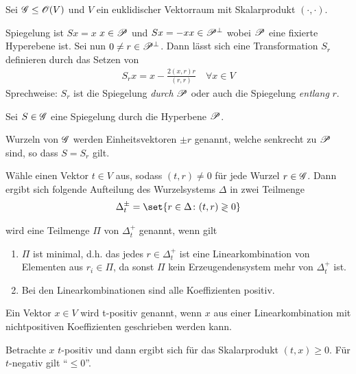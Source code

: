 Sei $\G \le \O(V)$ und $V$ ein euklidischer Vektorraum mit Skalarprodukt $(\cdot, \cdot)$.
\begin{*definition}
	Spiegelung ist $Sx = x$ $x \in \P$ und $Sx = -x x \in \P^{\perp}$ wobei $\P$ eine fixierte Hyperebene ist. Sei nun $0 \neq r \in \P^{\perp}$. Dann lässt sich eine Transformation $S_r$ definieren durch das Setzen von
	\begin{align*}
		S_r x = x - \frac{2(x,r)r}{(r,r)} \quad \forall x \in V
	\end{align*}
	Sprechweise: $S_r$ ist die Spiegelung \emph{durch} $\P$ oder auch die Spiegelung \emph{entlang} $r$.
\end{*definition}
Sei $S \in \G$ eine Spiegelung durch die Hyperbene $\P$.
\begin{*definition}
	Wurzeln von $\G$ werden Einheitsvektoren $\pm r$ genannt, welche senkrecht zu $\P$ sind, so dass $S = S_r$ gilt.
\end{*definition}
Wähle einen Vektor $t \in V$ aus, sodass $(t,r) \neq 0$ für jede Wurzel $r \in \G$. Dann ergibt sich folgende Aufteilung des Wurzelsystems $\Delta$ in zwei Teilmenge
\begin{align*}
	\Delta_t^{\pm} = \set{r \in \Delta \colon (t,r) \gtrless 0}
\end{align*}
\begin{*definition}
	 wird eine Teilmenge $\Pi$ von $\Delta_t^+$ genannt, wenn gilt
	\begin{enumerate}
		\item $\Pi$ ist minimal, d.h. das jedes $r \in \Delta_t^+$ ist eine Linearkombination von Elementen aus $r_i \in \Pi$, da sonst $\Pi$ kein Erzeugendensystem mehr von $\Delta_t^+$ ist.
		\item Bei den Linearkombinationen sind alle Koeffizienten positiv. 
	\end{enumerate}
\end{*definition}
\begin{*definition}
	Ein Vektor $x \in V$ wird t-positiv genannt, wenn $x$ aus einer Linearkombination mit nichtpositiven Koeffizienten geschrieben werden kann.
\end{*definition}
Betrachte $x$ $t$-positiv und dann ergibt sich für das Skalarprodukt $(t,x) \ge 0$. Für $t$-negativ gilt ``$\le 0$''.

